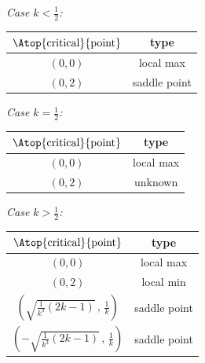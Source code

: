 %

\begin{answer}
\emph{Case $k<\frac{1}{2}$:\ \ \ }
\begin{center}
\renewcommand{\arraystretch}{1.3}
     \begin{tabular}{|c|c|}
     \hline
    $\Atop{\text{critical}}{\text{point}}$  & type \\    
    \hline
     $(0,0)$   & local max  \\ \hline
     $(0,2)$   & saddle point \\  \hline
     \end{tabular}
\renewcommand{\arraystretch}{1.0}
\end{center}


\emph{Case $k=\frac{1}{2}$:\ \ \ }
\begin{center}
\renewcommand{\arraystretch}{1.3}
     \begin{tabular}{|c|c|}
     \hline
    $\Atop{\text{critical}}{\text{point}}$  & type \\    
    \hline
     $(0,0)$   & local max  \\ \hline
     $(0,2)$   & unknown \\  \hline
     \end{tabular}
\renewcommand{\arraystretch}{1.0}
\end{center}

\emph{Case $k>\frac{1}{2}$:\ \ \ }
\begin{center}
\renewcommand{\arraystretch}{1.3}
     \begin{tabular}{|c|c|}
     \hline
    $\Atop{\text{critical}}{\text{point}}$   & type \\    
    \hline
     $(0,0)$    & local max  \\ \hline
     $(0,2)$    & local min \\  \hline
     $\left(\sqrt{\frac{1}{k^3}(2k-1)}\,,\,\frac{1}{k}\right)$  
                 & saddle point \\  \hline
     $\left(-\sqrt{\frac{1}{k^3}(2k-1)}\,,\,\frac{1}{k}\right)$  
                 & saddle point \\  \hline
     \end{tabular}
\renewcommand{\arraystretch}{1.0}
\end{center}
\end{answer}

